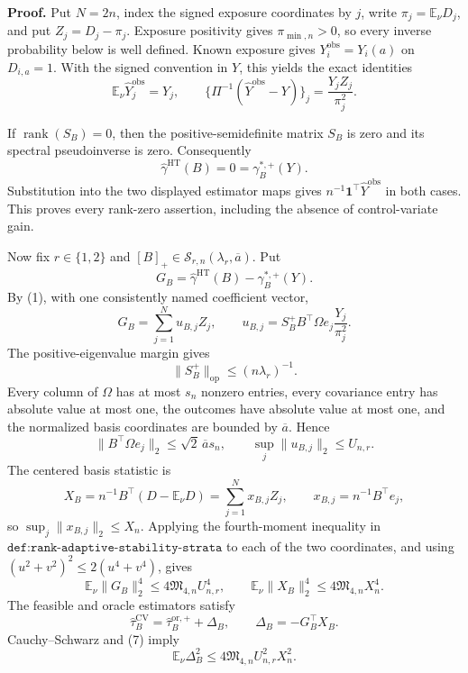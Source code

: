 \textbf{Proof.}
Put \(N=2n\), index the signed exposure coordinates by \(j\), write \(\pi_j=\mathbb E_\nu D_j\), and put \(Z_j=D_j-\pi_j\).  Exposure positivity gives \(\pi_{\min,n}>0\), so every inverse probability below is well defined.  Known exposure gives \(Y_i^{\mathrm{obs}}=Y_i(a)\) on \(D_{i,a}=1\).  With the signed convention in \(Y\), this yields the exact identities
\[
\mathbb E_\nu\widehat Y_j^{\mathrm{obs}}=Y_j,
\qquad
\{\Pi^{-1}(\widehat Y^{\mathrm{obs}}-Y)\}_j
=\frac{Y_jZ_j}{\pi_j^2}.
\tag{1}
\]

If \(\operatorname{rank}(S_B)=0\), then the positive-semidefinite matrix \(S_B\) is zero and its spectral pseudoinverse is zero.  Consequently
\[
\widehat\gamma^{\mathrm{HT}}(B)=0=\gamma_B^{*,+}(Y).
\tag{2}
\]
Substitution into the two displayed estimator maps gives \(n^{-1}\mathbf1^{\top}\widehat Y^{\mathrm{obs}}\) in both cases.  This proves every rank-zero assertion, including the absence of control-variate gain.

Now fix \(r\in\{1,2\}\) and \([B]_+\in\mathcal S_{r,n}(\lambda_r,\overline a)\).  Put
\[
G_B=\widehat\gamma^{\mathrm{HT}}(B)-\gamma_B^{*,+}(Y).
\]
By (1), with one consistently named coefficient vector,
\[
G_B=\sum_{j=1}^{N}u_{B,j}Z_j,
\qquad
u_{B,j}=S_B^+B^{\top}\Omega e_j\frac{Y_j}{\pi_j^2}.
\tag{3}
\]
The positive-eigenvalue margin gives
\[
\lVert S_B^+\rVert_{\mathrm{op}}\le(n\lambda_r)^{-1}.
\tag{4}
\]
Every column of \(\Omega\) has at most \(s_n\) nonzero entries, every covariance entry has absolute value at most one, the outcomes have absolute value at most one, and the normalized basis coordinates are bounded by \(\overline a\).  Hence
\[
\lVert B^{\top}\Omega e_j\rVert_2
\le\sqrt2\,\overline a s_n,
\qquad
\sup_j\lVert u_{B,j}\rVert_2\le U_{n,r}.
\tag{5}
\]
The centered basis statistic is
\[
X_B=n^{-1}B^{\top}(D-\mathbb E_\nu D)
=\sum_{j=1}^{N}x_{B,j}Z_j,
\qquad
x_{B,j}=n^{-1}B^{\top}e_j,
\tag{6}
\]
so \(\sup_j\lVert x_{B,j}\rVert_2\le X_n\).  Applying the fourth-moment inequality in \(\texttt{def:rank-adaptive-stability-strata}\) to each of the two coordinates, and using \((u^2+v^2)^2\le2(u^4+v^4)\), gives
\[
\mathbb E_\nu\lVert G_B\rVert_2^4
\le4\mathfrak M_{4,n}U_{n,r}^4,
\qquad
\mathbb E_\nu\lVert X_B\rVert_2^4
\le4\mathfrak M_{4,n}X_n^4.
\tag{7}
\]
The feasible and oracle estimators satisfy
\[
\widehat\tau_B^{\mathrm{CV}}
=\widehat\tau_B^{\mathrm{or},+}+\Delta_B,
\qquad
\Delta_B=-G_B^{\top}X_B.
\tag{8}
\]
Cauchy--Schwarz and (7) imply
\[
\mathbb E_\nu\Delta_B^2
\le4\mathfrak M_{4,n}U_{n,r}^2X_n^2.
\tag{9}
\]

